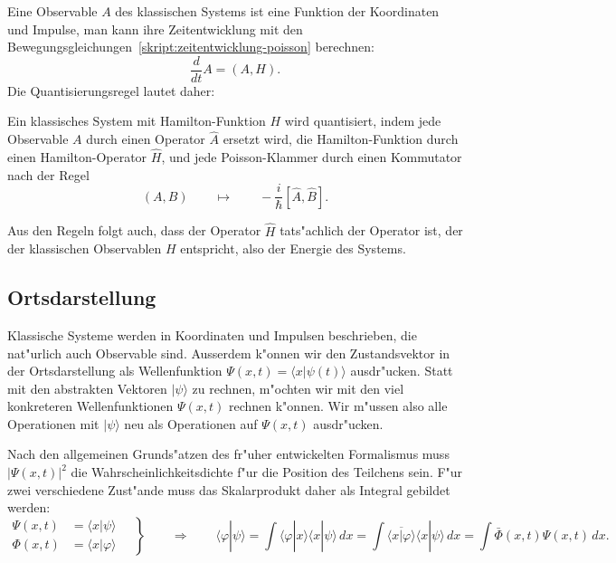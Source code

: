 Eine Observable $A$ des klassischen Systems ist eine Funktion der
Koordinaten und Impulse, man kann ihre Zeitentwicklung mit den
Bewegungsgleichungen~\ref{skript:zeitentwicklung-poisson}
berechnen:
\[
\frac{d}{dt}A=(A,H).
\]
Die Quantisierungsregel lautet daher:

\begin{satz}
\label{skript:quantisierung-poisson}
Ein klassisches System mit Hamilton-Funktion $H$ wird quantisiert, indem
jede Observable $A$ durch einen Operator $\hat A$ ersetzt wird, die
Hamilton-Funktion durch einen Hamilton-Operator $\hat H$, und jede
Poisson-Klammer durch einen Kommutator nach der Regel
\begin{equation}
(A,B)
\qquad
\mapsto
\qquad
-\frac{i}{\hbar}[\hat A,\hat B].
\label{skript:quantisierung-observable}
\end{equation}
\end{satz}
Aus den Regeln folgt auch, dass der Operator $\hat H$ tats"achlich
der Operator ist, der der klassischen Observablen $H$ entspricht, also der 
Energie des Systems.
\label{skript:hamilton-op-ist-energie}

\subsection{Ortsdarstellung}
Klassische Systeme werden in Koordinaten und Impulsen beschrieben, 
die nat"urlich auch Observable sind.
Ausserdem k"onnen wir den Zustandsvektor in der Ortsdarstellung
als Wellenfunktion $\Psi(x,t)=\langle x|\psi(t)\rangle$
ausdr"ucken.
Statt mit den abstrakten Vektoren $|\psi\rangle$ zu rechnen, m"ochten
wir mit den viel konkreteren Wellenfunktionen $\Psi(x,t)$ rechnen 
k"onnen. Wir m"ussen also alle Operationen mit $|\psi\rangle$ neu
als Operationen auf $\Psi(x,t)$ ausdr"ucken.

Nach den allgemeinen Grunds"atzen des fr"uher entwickelten Formalismus
muss $|\Psi(x,t)|^2$ die Wahrscheinlichkeitsdichte f"ur die Position
des Teilchens sein.
F"ur zwei verschiedene Zust"ande muss das Skalarprodukt daher als
Integral gebildet werden:
\[
\left.
\begin{aligned}
\Psi(x,t)&=\langle x|\psi\rangle\\
\Phi(x,t)&=\langle x|\varphi\rangle
\end{aligned}
\quad
\right\}
\qquad
\Rightarrow
\qquad
\langle\varphi|\psi\rangle
=
\int \langle\varphi|x\rangle\langle x|\psi\rangle\,dx
=
\int \overline{\langle x| \varphi\rangle}\langle x|\psi\rangle\,dx
=
\int \bar\Phi(x,t)\Psi(x,t)\,dx.
\]

